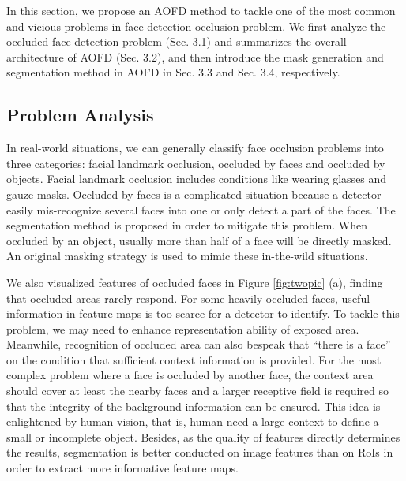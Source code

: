 \documentclass[10pt,twocolumn,letterpaper]{article}
\begin{document}
In this section, we propose an AOFD method to tackle one of the most common and vicious problems in face detection-occlusion problem. We first analyze the occluded face detection problem (Sec. 3.1) and summarizes the overall architecture of AOFD (Sec. 3.2), and then introduce the mask generation and segmentation method in AOFD in Sec. 3.3 and Sec. 3.4, respectively.


\subsection{Problem Analysis}\label{sec:problemanalysis}
In real-world situations, we can generally classify face occlusion problems into three categories: facial landmark occlusion, occluded by faces and occluded by objects. 
Facial landmark occlusion includes conditions like wearing glasses and gauze masks. Occluded by faces is a complicated situation because a detector easily mis-recognize several faces into one or only detect a part of the faces. The segmentation method is proposed in order to mitigate this problem. When occluded by an object, usually more than half of a face will be directly masked. An original masking strategy is used to mimic these in-the-wild situations.

We also visualized features of occluded faces in Figure \ref{fig:twopic} (a), finding that occluded areas rarely respond. For some heavily occluded faces, useful information in feature maps is too scarce for a detector to identify. To tackle this problem, we may need to enhance representation ability of exposed area. Meanwhile, recognition of occluded area can also bespeak that ``there is a face'' on the condition that sufficient context information is provided. For the most complex problem where a face is occluded by another face, the context area should cover at least the nearby faces and a larger receptive field is required so that the integrity of the background information can be ensured. This idea is enlightened by human vision, that is, human need a large context to define a small or incomplete object. Besides, as the quality of features directly determines the results, segmentation is better conducted on image features than on RoIs in order to extract more informative feature maps. 
\end{document}
